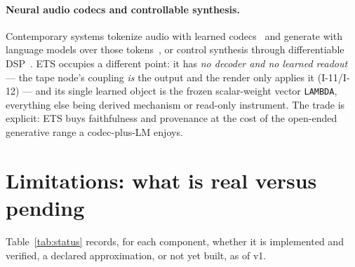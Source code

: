 \documentclass[11pt]{article}
\newcommand{\code}[1]{\texttt{\small #1}}
\begin{document}
\paragraph{Neural audio codecs and controllable synthesis.} Contemporary systems
tokenize audio with learned codecs~\cite{zeghidour2021soundstream,defossez2022encodec}
and generate with language models over those tokens~\cite{copet2023musicgen}, or
control synthesis through differentiable DSP~\cite{engel2020ddsp}. ETS occupies a
different point: it has \emph{no decoder and no learned readout} --- the tape node's
coupling \emph{is} the output and the render only applies it (I-11/I-12) --- and its
single learned object is the frozen scalar-weight vector \code{LAMBDA}, everything
else being derived mechanism or read-only instrument. The trade is explicit: ETS
buys faithfulness and provenance at the cost of the open-ended generative range a
codec-plus-LM enjoys.

\section{Limitations: what is real versus pending}

Table~\ref{tab:status} records, for each component, whether it is implemented and
verified, a declared approximation, or not yet built, as of v1.
\end{document}
